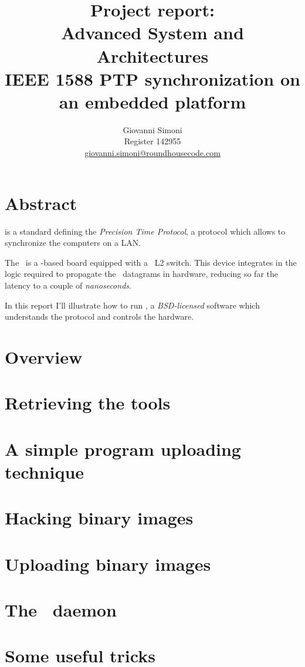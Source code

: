 \documentclass[10pt,a4paper]{article}
\title {
    Project report:\\
    Advanced System and Architectures\\
    IEEE 1588 PTP synchronization on an embedded platform
}
\author{
    Giovanni Simoni\\
    Register 142955\\
    \href{mailto:giovanni.simoni@roundhousecode.com}
         {giovanni.simoni@roundhousecode.com}
}
\begin{document}
\maketitle

    \section*{ \center Abstract }

         is a standard defining the \emph{Precision
        Time Protocol}, a protocol which allows to synchronize the
        computers on a LAN.

        The \MyBoard\ is a \PPC-based board equipped with a
        \Vitesse\ L2 switch. This device integrates in the logic required
        to propagate the \PTP\ datagrams in hardware, reducing so far the
        latency to a couple of \emph{nanoseconds}.

        In this report I'll illustrate how to run \PTPd, a
        \emph{BSD-licensed} software which understands the protocol and
        controls the hardware.

    \tableofcontents
    \newpage

    \section{ Overview } \label{sec:Overview}
    

    \section{ Retrieving the tools } \label{sec:GetTools}
    

    \section{ A simple program uploading technique } \label{sec:Upload}
    

    \section{ Hacking binary images } \label{sec:HackImages}
    

    \section{ Uploading binary images } \label{sec:UploadImages}
    

    \section{ The \PTP\ daemon } \label{sec:PTPd}
    

    \section{ Some useful tricks } \label{sec:Tricks}
    

\end{document}
